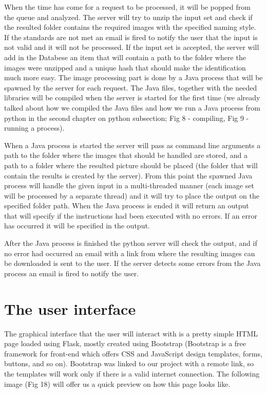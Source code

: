 \documentclass[12pt, a4paper]{report}
\begin{document}
When the time has come for a request to be processed, it will be popped from the queue and analyzed. The server will try to unzip the input set and check if the resulted folder contains the required images with the specified naming style. If the standards are not met an email is fired to notify the user that the input is not valid and it will not be processed. If the input set is accepted, the server will add in the Databese an item that will contain a path to the folder where the images were unzipped and a unique hash that should make the identification much more easy. The image processing part is done by a Java process that will be spawned by the server for each request. The Java files, together with the needed libraries will be compiled when the server is started for the first time (we already talked about how we compiled the Java files and how we run a Java process from python in the second chapter on python subsection; Fig 8 - compiling, Fig 9 - running a process). 
\par 

When a Java process is started the server will pass as command line arguments a path to the folder where the images that should be handled are stored, and a path to a folder where the resulted picture should be placed (the folder that will contain the results is created by the server). From this point the spawned Java process will handle the given input in a multi-threaded manner (each image set will be processed by a separate thread) and it will try to place the output on the specified folder path. When the Java process is ended it will return an output that will specify if the instructions had been executed with no errors. If an error has occurred it will be specified in the output. 
\par 

After the Java process is finished the python server will check the output, and if no error had occurred an email with a link from where the resulting images can be downloaded is sent to the user. If the server detects some errors from the Java process an email is fired to notify the user.



\newpage
\section{The user interface}

\quad
The graphical interface that the user will interact with is a pretty simple HTML page loaded using Flask, mostly created using Bootstrap (Bootstrap is a free framework for front-end which offers CSS and JavaScript design templates, forms, buttons, and so on). Bootstrap was linked to our project with a remote link, so the templates will work only if there is a valid internet connection. The following image (Fig 18) will offer us a quick preview on how this page looks like.
\end{document}
